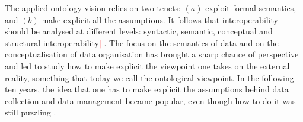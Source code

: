 \documentclass[ao]{iosart2x}
\newcommand{\nb}[1]{\textcolor{red}{$|$}\marginpar{\hspace*{-0cm}\parbox{20mm}{\scriptsize\raggedright\textcolor{red}{#1}}}}
\begin{document}
The applied ontology vision relies on two tenets: $(a)$ exploit formal semantics, and $(b)$ make explicit all the assumptions. It follows that interoperability should be analysed at different levels: syntactic, semantic, conceptual and structural interoperability\nb{CM: mi suona strano questo interoperability, perché parlavamo di livelli, forse si può semplicemente togliere} \citep{guarinoOntologicalLevel1998}. The focus on the semantics of data and on the conceptualisation of data organisation has brought a sharp chance of perspective and led to study how to make explicit the viewpoint one takes on the external reality, something that today we call the ontological viewpoint. In the following ten years, the idea that one has to make explicit the assumptions behind data collection and data management became popular, even though how to do it was still puzzling \citep{oukselSemanticInteroperability1999}. 
\end{document}
